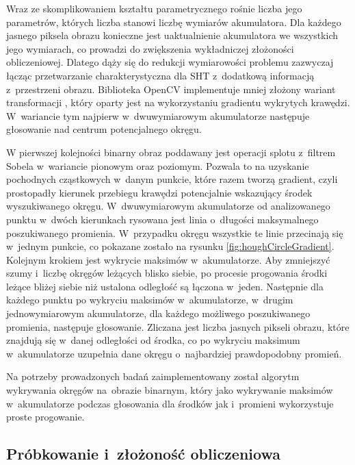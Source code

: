 Wraz ze skomplikowaniem kształtu parametrycznego rośnie liczba jego parametrów, których liczba stanowi liczbę wymiarów akumulatora. Dla każdego jasnego piksela obrazu konieczne jest uaktualnienie akumulatora we wszystkich jego wymiarach, co prowadzi do zwiększenia wykładniczej złożoności obliczeniowej. Dlatego dąży się do redukcji wymiarowości problemu zazwyczaj łącząc przetwarzanie charakterystyczna dla SHT z~dodatkową informacją z~przestrzeni obrazu. Biblioteka OpenCV implementuje mniej złożony wariant transformacji \cite{ito2012detection}, który oparty jest na wykorzystaniu gradientu wykrytych krawędzi. W~wariancie tym najpierw w~dwuwymiarowym akumulatorze następuje głosowanie nad centrum potencjalnego okręgu.

W pierwszej kolejności binarny obraz poddawany jest operacji splotu z~filtrem Sobela w~wariancie pionowym oraz poziomym. Pozwala to na uzyskanie pochodnych cząstkowych w~danym punkcie, które razem tworzą gradient, czyli prostopadły kierunek przebiegu krawędzi potencjalnie wskazujący środek wyszukiwanego okręgu. W~dwuwymiarowym akumulatorze od analizowanego punktu w~dwóch kierunkach rysowana jest linia o~długości maksymalnego poszukiwanego promienia. W~przypadku okręgu wszystkie te linie przecinają się w~jednym punkcie, co pokazane zostało na rysunku \ref{fig:houghCircleGradient}. Kolejnym krokiem jest wykrycie maksimów w~akumulatorze. Aby zmniejszyć szumy i~liczbę okręgów leżących blisko siebie, po procesie progowania środki leżące bliżej siebie niż ustalona odległość są łączona w~jeden. Następnie dla każdego punktu po wykryciu maksimów w~akumulatorze, w~drugim jednowymiarowym akumulatorze, dla każdego możliwego poszukiwanego promienia, następuje głosowanie. Zliczana jest liczba jasnych pikseli obrazu, które znajdują się w~danej odległości od środka, co po wykryciu maksimum w~akumulatorze uzupełnia dane okręgu o~najbardziej prawdopodobny promień.

Na potrzeby prowadzonych badań zaimplementowany został algorytm wykrywania okręgów na~obrazie binarnym, który jako wykrywanie maksimów w~akumulatorze podczas głosowania dla środków jak i~promieni wykorzystuje proste progowanie.

\subsection{Próbkowanie i~złożoność obliczeniowa}

